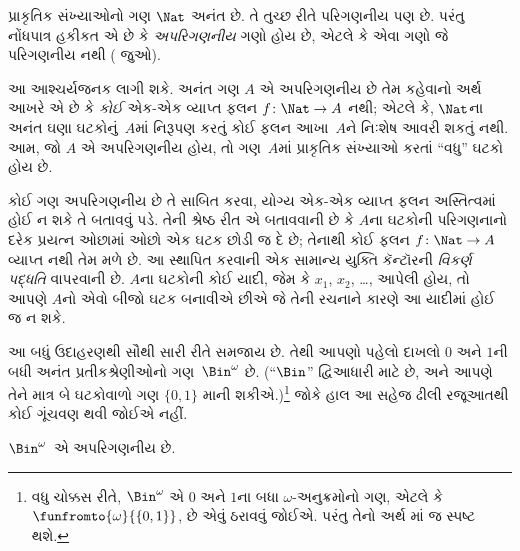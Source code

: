 \begin{explain}
પ્રાકૃતિક સંખ્યાઓનો ગણ $\Nat$ અનંત છે. તે તુચ્છ રીતે
પરિગણનીય પણ છે. પરંતુ નોંધપાત્ર હકીકત એ છે કે
\emph{અપરિગણનીય} ગણો હોય છે, એટલે કે એવા ગણો જે
પરિગણનીય નથી ( જુઓ).

આ આશ્ચર્યજનક લાગી શકે. અનંત ગણ $A$ એ અપરિગણનીય છે તેમ કહેવાનો
અર્થ આખરે એ છે કે \emph{કોઈ} એક-એક વ્યાપ્ત ફલન $f \colon \Nat \to A$
નથી; એટલે કે, $\Nat$ના અનંત ઘણા ઘટકોનું~$A$માં નિરૂપણ
કરતું કોઈ ફલન આખા~$A$ને નિઃશેષ આવરી શકતું નથી. આમ, જો $A$ એ
અપરિગણનીય હોય, તો ગણ~$A$માં પ્રાકૃતિક સંખ્યાઓ કરતાં “વધુ”
ઘટકો હોય છે.

કોઈ ગણ અપરિગણનીય છે તે સાબિત કરવા, યોગ્ય એક-એક વ્યાપ્ત ફલન
અસ્તિત્વમાં હોઈ ન શકે તે બતાવવું પડે. તેની શ્રેષ્ઠ રીત એ બતાવવાની
છે કે $A$ના ઘટકોની પરિગણનાનો દરેક પ્રયત્ન ઓછામાં ઓછો એક
ઘટક છોડી જ દે છે; તેનાથી કોઈ ફલન $f\colon \Nat \to A$
વ્યાપ્ત નથી તેમ મળે છે. આ સ્થાપિત કરવાની એક સામાન્ય યુક્તિ
કૅન્ટૉરની \emph{વિકર્ણ પદ્ધતિ} વાપરવાની છે. $A$ના ઘટકોની
કોઈ યાદી, જેમ કે $x_1$, $x_2$, \dots, આપેલી હોય, તો આપણે $A$નો
એવો બીજો ઘટક બનાવીએ છીએ જે તેની રચનાને કારણે આ યાદીમાં
હોઈ જ ન શકે.

આ બધું ઉદાહરણથી સૌથી સારી રીતે સમજાય છે. તેથી આપણો પહેલો દાખલો
$0$ અને $1$ની બધી અનંત પ્રતીકશ્રેણીઓનો ગણ~$\Bin^\omega$ છે.
(“$\Bin$” દ્વિઆધારી માટે છે, અને આપણે તેને માત્ર બે ઘટકોવાળો ગણ
$\{0,1\}$ માની શકીએ.)\footnote{વધુ
ચોક્કસ રીતે, $\Bin^\omega$ એ $0$ અને $1$ના બધા $\omega$-અનુક્રમોનો
ગણ, એટલે કે $\funfromto{\omega}{\{0,1\}}$, છે એવું ઠરાવવું જોઈએ.
પરંતુ તેનો અર્થ માં જ
સ્પષ્ટ થશે.}
જોકે હાલ આ સહેજ ઢીલી રજૂઆતથી કોઈ ગૂંચવણ થવી જોઈએ નહીં.
\end{explain}

\begin{thm}
$\Bin^\omega$~એ અપરિગણનીય છે.
\end{thm}

